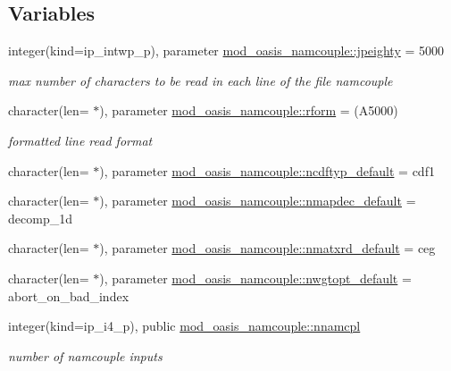 \subsection*{Variables}
\begin{DoxyCompactItemize}
\item 
integer(kind=ip\+\_\+intwp\+\_\+p), parameter \hyperlink{namespacemod__oasis__namcouple_a4fb10ad6e864dcbe34c4a8b02204a523}{mod\+\_\+oasis\+\_\+namcouple\+::jpeighty} = 5000
\begin{DoxyCompactList}\small\item\em max number of characters to be read in each line of the file namcouple \end{DoxyCompactList}\item 
character(len= $\ast$), parameter \hyperlink{namespacemod__oasis__namcouple_a32ce50ab82412ce502420b56a4e47d71}{mod\+\_\+oasis\+\_\+namcouple\+::rform} = \textquotesingle{}(A5000)\textquotesingle{}
\begin{DoxyCompactList}\small\item\em formatted line read format \end{DoxyCompactList}\item 
character(len= $\ast$), parameter \hyperlink{namespacemod__oasis__namcouple_a364261272167da845e00420a5c2eb08e}{mod\+\_\+oasis\+\_\+namcouple\+::ncdftyp\+\_\+default} = \textquotesingle{}cdf1\textquotesingle{}
\item 
character(len= $\ast$), parameter \hyperlink{namespacemod__oasis__namcouple_a88ddb8ab5304da53ddf232e72b31cd45}{mod\+\_\+oasis\+\_\+namcouple\+::nmapdec\+\_\+default} = \textquotesingle{}decomp\+\_\+1d\textquotesingle{}
\item 
character(len= $\ast$), parameter \hyperlink{namespacemod__oasis__namcouple_a81f8b2668d8970564e85db2ac2465866}{mod\+\_\+oasis\+\_\+namcouple\+::nmatxrd\+\_\+default} = \textquotesingle{}ceg\textquotesingle{}
\item 
character(len= $\ast$), parameter \hyperlink{namespacemod__oasis__namcouple_a3b0f98a2f8fc07f944af7fc650ea3eff}{mod\+\_\+oasis\+\_\+namcouple\+::nwgtopt\+\_\+default} = \textquotesingle{}abort\+\_\+on\+\_\+bad\+\_\+index\textquotesingle{}
\item 
integer(kind=ip\+\_\+i4\+\_\+p), public \hyperlink{namespacemod__oasis__namcouple_a5ca7cd6a5b9f939b68492200aa92bab4}{mod\+\_\+oasis\+\_\+namcouple\+::nnamcpl}
\begin{DoxyCompactList}\small\item\em number of namcouple inputs \end{DoxyCompactList}\item 

\end{DoxyCompactItemize}
